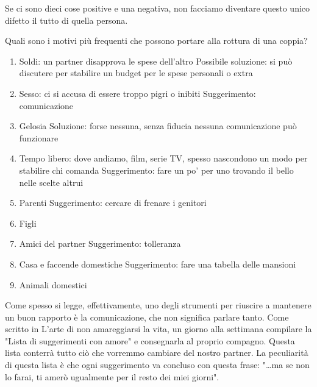 \documentclass[12pt]{book} %
\begin{document}
Se ci sono dieci cose positive e una negativa, non facciamo diventare questo unico difetto il tutto di quella persona.

Quali sono i motivi più frequenti che possono portare alla rottura di una coppia?

\begin{enumerate}
\item Soldi: un partner disapprova le spese dell'altro\newline
Possibile soluzione: si può discutere per stabilire un budget per le spese personali o extra
\item Sesso: ci si accusa di essere troppo pigri o inibiti \newline
Suggerimento: comunicazione
\item Gelosia\newline
Soluzione: forse nessuna, senza fiducia nessuna comunicazione può funzionare
\item Tempo libero: dove andiamo, film, serie TV, spesso nascondono un modo per stabilire chi comanda \newline
Suggerimento: fare un po' per uno trovando il bello nelle scelte altrui
\item Parenti \newline
Suggerimento: cercare di frenare i genitori
\item Figli
\item Amici del partner \newline
Suggerimento: tolleranza
\item Casa e faccende domestiche \newline
Suggerimento: fare una tabella delle mansioni
\item Animali domestici
\end{enumerate}
Come spesso si legge, effettivamente, uno degli strumenti per riuscire a mantenere un buon rapporto è la comunicazione,
che non significa parlare tanto. Come scritto in L'arte di non amareggiarsi la
vita, un giorno alla settimana compilare la "Lista
di suggerimenti con amore" e consegnarla al proprio compagno. Questa lista conterrà tutto ciò che
vorremmo cambiare del nostro partner. La peculiarità di questa lista è che ogni suggerimento va concluso con questa
frase: "…ma se non lo farai, ti amerò ugualmente per il resto dei miei
giorni". 
\end{document}

